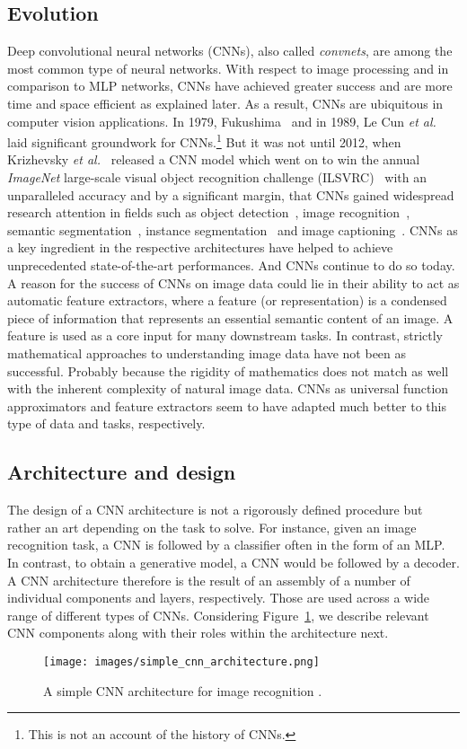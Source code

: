\documentclass[a4paper,12pt]{report}
\begin{document}
\subsection{Evolution}
Deep convolutional neural networks (CNNs), also called \textit{convnets}, are among the most common type of neural networks. With respect to image processing and in comparison to MLP networks, CNNs have achieved greater success and are more time and space efficient as explained later. As a result, CNNs are ubiquitous in computer vision applications. In 1979, Fukushima~\cite{FukushimaCnn79} and in 1989, Le Cun \textit{et al.}~\cite{CunGrounworkCNNs} laid significant groundwork for CNNs.\footnote{This is not an account of the history of CNNs.} But it was not until 2012, when Krizhevsky \textit{et al.}~\cite{AlexNet} released a CNN model which went on to win the annual \textit{ImageNet} large-scale visual object recognition challenge (ILSVRC)~\cite{Imagenet} with an unparalleled accuracy and by a significant margin, that CNNs gained widespread research attention in fields such as object detection~\cite{FasterRCNN}, image recognition~\cite{AlexNet,DenseNet}, semantic segmentation~\cite{DeepLabv3+}, instance segmentation~\cite{MaskScoringRCNN} and image captioning~\cite{ImageCaptioningSOTA}. CNNs as a key ingredient in the respective architectures have helped to achieve unprecedented state-of-the-art performances. And CNNs continue to do so today. A reason for the success of CNNs on image data could lie in their ability to act as automatic feature extractors, where a feature (or representation) is a condensed piece of information that represents an essential semantic content of an image. A feature is used as a core input for many downstream tasks. In contrast, strictly mathematical approaches to understanding image data have not been as successful. Probably because the rigidity of mathematics does not match as well with the inherent complexity of natural image data. CNNs as universal function approximators and feature extractors seem to have adapted much better to this type of data and tasks, respectively.

\subsection{Architecture and design}
The design of a CNN architecture is not a rigorously defined procedure but rather an art depending on the task to solve. For instance, given an image recognition task, a CNN is followed by a classifier often in the form of an MLP. In contrast, to obtain a generative model, a CNN would be followed by a decoder. A CNN architecture therefore is the result of an assembly of a number of individual components and layers, respectively. Those are used across a wide range of different types of CNNs. Considering Figure~\ref{fig:simple_cnn_arch}, we describe relevant CNN components along with their roles within the architecture  next. 
\begin{figure}[H]
\centering
\texttt{[image: images/simple\_cnn\_architecture.png]}
\caption{A simple CNN architecture for image recognition \cite{cnn_arch_article}.}
\label{fig:simple_cnn_arch}
\end{figure}
\end{document}
